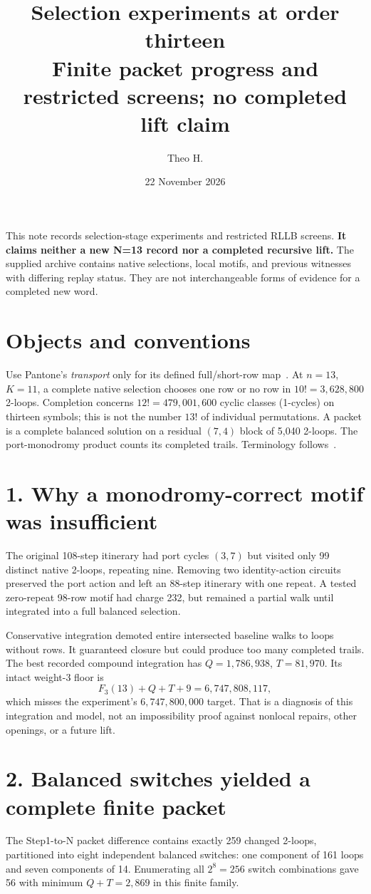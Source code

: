 \documentclass[11pt]{article}
\title{\vspace{-1.5em}Selection experiments at order thirteen\\
\large Finite packet progress and restricted screens; no completed lift claim}
\author{Theo H.}
\date{22 November 2026}
\begin{document}
\maketitle
\vspace{-1.5em}
This note records selection-stage experiments and restricted RLLB screens.
\textbf{It claims neither a new N=13 record nor a completed recursive lift.}
The supplied archive contains native selections, local motifs, and previous
witnesses with differing replay status. They are not interchangeable forms
of evidence for a completed new word.

\section*{Objects and conventions}
Use Pantone's \emph{transport} only for its defined full/short-row map~\cite{pantone}.
At $n=13$, $K=11$, a complete native selection chooses one row or no row in
$10!=3{,}628{,}800$ 2-loops. Completion concerns
$12!=479{,}001{,}600$ cyclic classes (1-cycles) on thirteen symbols;
this is not the number $13!$ of individual permutations.
A packet is a complete balanced solution on a residual $(7,4)$ block of
5,040 2-loops. The port-monodromy product counts its completed trails.
Terminology follows~\cite{glossary,spra}.

\section*{1. Why a monodromy-correct motif was insufficient}
The original 108-step itinerary had port cycles $(3,7)$ but visited only
99 distinct native 2-loops, repeating nine. Removing two identity-action
circuits preserved the port action and left an 88-step itinerary with one
repeat. A tested zero-repeat 98-row motif had charge 232, but remained a
partial walk until integrated into a full balanced selection.

Conservative integration demoted entire intersected baseline walks to
loops without rows. It guaranteed closure but could produce too many
completed trails. The best recorded compound integration has
$Q=1{,}786{,}938$, $T=81{,}970$. Its intact weight-3 floor is
\[
F_3(13)+Q+T+9=6{,}747{,}808{,}117,
\]
which misses the experiment's $6{,}747{,}800{,}000$ target.
That is a diagnosis of this integration and model, not an impossibility
proof against nonlocal repairs, other openings, or a future lift.

\section*{2. Balanced switches yielded a complete finite packet}
The Step1-to-N packet difference contains exactly 259 changed 2-loops,
partitioned into eight independent balanced switches: one component of
161 loops and seven components of 14. Enumerating all $2^8=256$ switch
combinations gave 56 with minimum $Q+T=2,869$ in this finite family.
\end{document}
